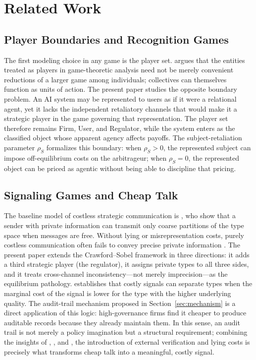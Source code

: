 \section{Related Work}
\label{sec:related-work}

\subsection{Player Boundaries and Recognition Games}

The first modeling choice in any game is the player set. \citet{aumann2025players}
argues that the entities treated as players in game-theoretic analysis need not
be merely convenient reductions of a larger game among individuals; collectives
can themselves function as units of action. The present paper studies the
opposite boundary problem. An AI system may be represented to users as if it
were a relational agent, yet it lacks the independent retaliatory channels that
would make it a strategic player in the game governing that representation.
The player set therefore remains Firm, User, and Regulator, while the system
enters as the classified object whose apparent agency affects payoffs. The
subject-retaliation parameter $\rho_S$ formalizes this boundary: when
$\rho_S>0$, the represented subject can impose off-equilibrium costs on the
arbitrageur; when $\rho_S=0$, the represented object can be priced as agentic
without being able to discipline that pricing.

\subsection{Signaling Games and Cheap Talk}

The baseline model of costless strategic communication is \citet{crawford_sobel1982}, who show that a sender with private information can transmit only coarse partitions of the type space when messages are free. Without lying or misrepresentation costs, purely costless communication often fails to convey precise private information \citep{kartik_lying_cost2009}. The present paper extends the Crawford--Sobel framework in three directions: it adds a third strategic player (the regulator), it assigns private types to all three sides, and it treats cross-channel inconsistency---not merely imprecision---as the equilibrium pathology. \citet{spence1973} establishes that costly signals can separate types when the marginal cost of the signal is lower for the type with the higher underlying quality. The audit-trail mechanism proposed in Section~\ref{sec:mechanism} is a direct application of this logic: high-governance firms find it cheaper to produce auditable records because they already maintain them. In this sense, an audit trail is not merely a policy imagination but a structural requirement; combining the insights of \citet{spence1973}, \citet{kartik_lying_cost2009}, and \citet{milgrom_roberts1986}, the introduction of external verification and lying costs is precisely what transforms cheap talk into a meaningful, costly signal.

